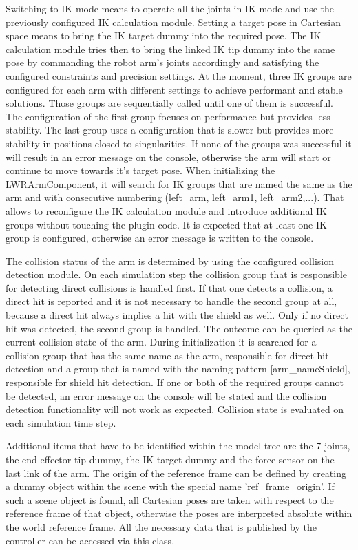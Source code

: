   Switching to IK mode means to operate all the joints in IK mode and use the previously configured   
  IK calculation module. Setting a target pose in Cartesian space means to bring the IK target dummy
  into the required pose. The IK calculation module tries then to bring the linked IK tip dummy into
  the same pose by commanding the robot arm's joints accordingly and satisfying the configured
  constraints and precision settings. At the moment, three IK groups are configured for
  each arm with different settings to achieve performant and stable solutions. Those groups are
  sequentially called until one of them is successful. The configuration of the first group focuses
  on performance but provides less stability. The last group uses a configuration that is slower but
  provides more stability in positions closed to singularities. If none of the groups was successful
  it will result in an error message on the console, otherwise the arm will start or continue to move
  towards it's target pose. When initializing the LWRArmComponent, it will search for IK groups that 
  are named the same as the arm and with consecutive numbering (left\_arm, left\_arm1,
  left\_arm2,...).
  That allows to reconfigure the IK calculation module and introduce additional IK groups without 
  touching the plugin code. It is expected that at least one IK group is configured, otherwise
  an error message is written to the console.
  
  The collision status of the arm is determined by using the configured collision detection module.
  On each simulation step the collision group that is responsible for detecting direct collisions is 
  handled first. If that one detects a collision, a direct hit is reported and it is not necessary
  to handle the second group at all, because a direct hit always implies a hit with the shield as
  well. Only if no direct hit was detected, the second group is handled. The outcome can be queried
  as the current collision state of the arm. During initialization it is searched for a collision
  group that has the same name as the arm, responsible for direct hit detection and a group that is
  named with the naming pattern [arm\_nameShield], responsible for shield hit detection. If one or
  both of the required groups cannot be detected, an error message on the console will be stated and
  the collision detection functionality will not work as expected. Collision state is evaluated on 
  each simulation time step.
  
  Additional items that have to be identified within the model tree are the 7 joints, the end
  effector tip dummy, the IK target dummy and the force sensor on the last link of the arm. The
  origin of the reference frame can be defined by creating a dummy object within the scene with
  the special name 'ref\_frame\_origin'. If such a scene object is found, all Cartesian poses are
  taken with respect to the reference frame of that object, otherwise the poses are interpreted
  absolute within the world reference frame. All the necessary data that is published by the 
  controller can be accessed via this class.
  
